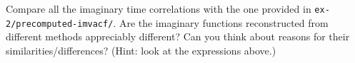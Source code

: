 \documentclass{article}
\begin{document}
\begin{Exercise}[label={relationship},title={Relationship between imaginary and real time correlations}]
Compare all the imaginary time correlations with the one provided in \texttt{ex-2/precomputed-imvacf/}. Are the imaginary functions reconstructed from different methods appreciably different? Can you think about reasons for their similarities/differences? (Hint: look at the expressions above.)


\end{Exercise}


\clearpage





\end{document}
